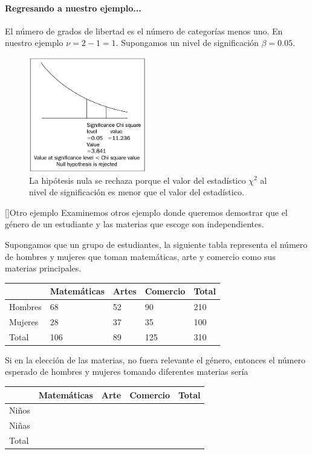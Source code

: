 \paragraph{Regresando a nuestro ejemplo...}
El número de grados de libertad es el número de categorías menos uno.  En nuestro ejemplo $\nu = 2-1 =1.$  Supongamos un nivel de significación $\beta=0.05.$


\begin{figure}[h]
 \centering
 \includegraphics[height=5cm,keepaspectratio=true]{./images/kum0407.png}
 \caption{La hipótesis nula se rechaza porque el valor del estadístico $\chi^2$ al nivel de significación es menor que el valor del estadístico.}
 \label{fig:0407}
\end{figure}


[]{Otro ejemplo}
Examinemos otros ejemplo donde queremos demostrar que el género de un estudiante y las materias que escoge son independientes.


Supongamos que un grupo de estudiantes, la siguiente tabla representa el número de hombres y mujeres que toman matemáticas, arte y comercio como sus materias principales.


\begin{center}
\begin{tabular}{|l|l|l|l|l|}\hline
 & Matemáticas & Artes & Comercio & Total\\\hline
Hombres & 68 & 52 & 90 & 210\\\hline
Mujeres & 28 & 37 & 35 & 100\\\hline
Total & 106 & 89 & 125 & 310\\\hline
\end{tabular}
\end{center}



Si en la elección de las materias, no fuera relevante el género, entonces el número esperado de hombres y mujeres tomando diferentes materias sería
\begin{center}
\begin{tabular}{|l|l|l|l|l|}\hline
 & Matemáticas & Arte & Comercio & Total\\\hline
Niños &  &  &  & \\\hline
Niñas &  &  &  & \\\hline
Total &  &  &  & \\\hline
\end{tabular}
\end{center}



